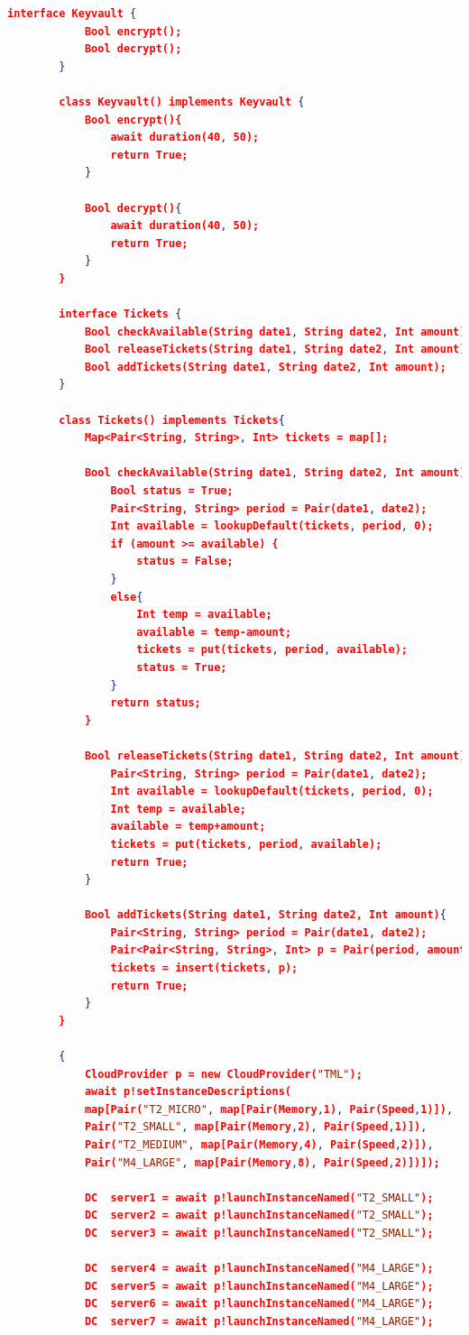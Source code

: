 \documentclass[10pt,a4paper,twocolumn]{article}
\begin{document}
\begin{appendices}
\begin{lstlisting}[language=json]
		interface Keyvault {
			Bool encrypt();
			Bool decrypt();
		}
		
		class Keyvault() implements Keyvault {
			Bool encrypt(){
				await duration(40, 50);
				return True;
			}
			
			Bool decrypt(){
				await duration(40, 50);
				return True;
			}
		}
		
		interface Tickets {
			Bool checkAvailable(String date1, String date2, Int amount);
			Bool releaseTickets(String date1, String date2, Int amount);
			Bool addTickets(String date1, String date2, Int amount);
		}
		
		class Tickets() implements Tickets{
			Map<Pair<String, String>, Int> tickets = map[];
			
			Bool checkAvailable(String date1, String date2, Int amount){
				Bool status = True;
				Pair<String, String> period = Pair(date1, date2);
				Int available = lookupDefault(tickets, period, 0);
				if (amount >= available) {
					status = False;
				}
				else{
					Int temp = available;
					available = temp-amount;
					tickets = put(tickets, period, available);
					status = True;
				}
				return status;
			}
			
			Bool releaseTickets(String date1, String date2, Int amount){
				Pair<String, String> period = Pair(date1, date2);
				Int available = lookupDefault(tickets, period, 0);
				Int temp = available;
				available = temp+amount;
				tickets = put(tickets, period, available);
				return True;
			}
			
			Bool addTickets(String date1, String date2, Int amount){
				Pair<String, String> period = Pair(date1, date2);
				Pair<Pair<String, String>, Int> p = Pair(period, amount);
				tickets = insert(tickets, p);
				return True;
			}
		}
		
		{
			CloudProvider p = new CloudProvider("TML");
			await p!setInstanceDescriptions(
			map[Pair("T2_MICRO", map[Pair(Memory,1), Pair(Speed,1)]),
			Pair("T2_SMALL", map[Pair(Memory,2), Pair(Speed,1)]),
			Pair("T2_MEDIUM", map[Pair(Memory,4), Pair(Speed,2)]),
			Pair("M4_LARGE", map[Pair(Memory,8), Pair(Speed,2)])]);
			
			DC  server1 = await p!launchInstanceNamed("T2_SMALL");
			DC  server2 = await p!launchInstanceNamed("T2_SMALL");
			DC  server3 = await p!launchInstanceNamed("T2_SMALL");
			
			DC  server4 = await p!launchInstanceNamed("M4_LARGE");
			DC  server5 = await p!launchInstanceNamed("M4_LARGE");
			DC  server6 = await p!launchInstanceNamed("M4_LARGE");
			DC  server7 = await p!launchInstanceNamed("M4_LARGE");
			

\end{lstlisting}
\end{appendices}
\end{document}
